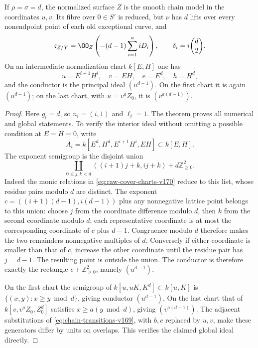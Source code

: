 \begin{corollary}\label{cor:equal-power-v170}
If $\rho=\sigma=d$, the normalized surface $Z$ is the smooth chain
model in the coordinates $u,v$. Its fibre over $0\in S'$ is reduced,
but $\nu$ has $d$ lifts over every nonendpoint point of each old
exceptional curve, and
\[
 \mathfrak c_{Z/Y}=\OO_Z\left(-(d-1)\sum_{i=1}^a iD_i\right),
 \qquad \delta_i=i\binom d2.
\]
On an intermediate normalization chart $k[E,H]$ one has
\[
 u=E^{i+1}H^i,\quad v=EH,\quad e=E^d,\quad h=H^d,
\]
and the conductor is the principal ideal $(u^{d-1})$. On the first
chart it is again $(u^{d-1})$; on the last chart, with
$u=v^a Z_0$, it is $(v^{a(d-1)})$.
\end{corollary}
\begin{proof}
Here $g_i=d$, so $n_i=(i,1)$ and $\ell_i=1$. The theorem proves
all numerical and global statements. To verify the interior ideal
without omitting a possible condition at $E=H=0$, write
\[
 A_i=k[E^d,H^d,E^{i+1}H^i,EH]\subset k[E,H].
\]
The exponent semigroup is the disjoint union
\[
 \coprod_{0\leq j,k<d}
 ((i+1)j+k,ij+k)+d\mathbb Z_{\geq0}^2.
\]
Indeed the monic relations in \eqref{eq:raw-cover-charts-v170}
reduce to this list, whose residue pairs modulo $d$ are distinct.
The exponent $c=((i+1)(d-1),i(d-1))$ plus any nonnegative lattice
point belongs to this union: choose $j$ from the coordinate
difference modulo $d$, then $k$ from the second coordinate modulo
$d$; each representative coordinate is at most the corresponding
coordinate of $c$ plus $d-1$. Congruence modulo $d$ therefore makes
the two remainders nonnegative multiples of $d$. Conversely if either coordinate is smaller than that of $c$,
increase the other coordinate until the residue pair has $j=d-1$.
The resulting point is outside the union. The conductor is therefore
exactly the rectangle $c+\mathbb Z_{\geq0}^2$, namely $(u^{d-1})$.

On the first chart the semigroup of
$k[u,uK,K^d]\subset k[u,K]$ is
$\{(x,y):x\geq y\bmod d\}$, giving conductor $(u^{d-1})$.
On the last chart that of $k[v,v^aZ_0,Z_0^d]$ satisfies
$x\geq a(y\bmod d)$, giving $(v^{a(d-1)})$.
The adjacent substitutions of \eqref{eq:chain-transitions-v169},
with $b,c$ replaced by $u,v$, make these generators differ by units
on overlaps. This verifies the claimed global ideal directly.
\end{proof}

